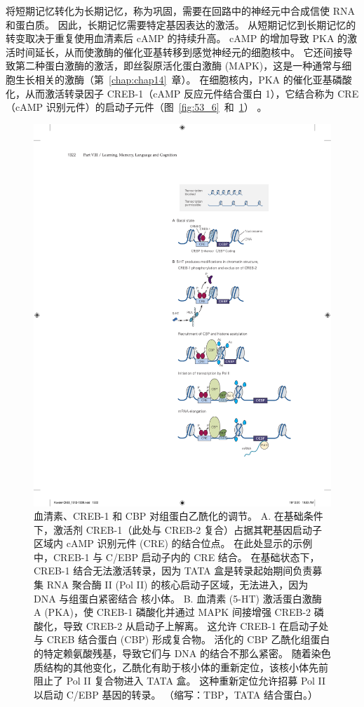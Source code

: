 将短期记忆转化为长期记忆，称为巩固，需要在回路中的神经元中合成信使 RNA 和蛋白质。
因此，长期记忆需要特定基因表达的激活。
从短期记忆到长期记忆的转变取决于重复使用血清素后 cAMP 的持续升高。
cAMP 的增加导致 PKA 的激活时间延长，从而使激酶的催化亚基转移到感觉神经元的细胞核中。
它还间接导致第二种蛋白激酶的激活，即丝裂原活化蛋白激酶 (MAPK)，这是一种通常与细胞生长相关的激酶（第~\ref{chap:chap14}~章）。
在细胞核内，PKA 的催化亚基磷酸化，从而激活转录因子 CREB-1（cAMP 反应元件结合蛋白 1），它结合称为 CRE（cAMP 识别元件）的启动子元件（图~\ref{fig:53_6}~和~\ref{fig:53_7}） 。


\begin{figure}[htbp]
	\centering
	\includegraphics[width=0.6\linewidth]{chap53/fig_53_7}
	\caption{血清素、CREB-1 和 CBP 对组蛋白乙酰化的调节。 A. 在基础条件下，激活剂 CREB-1（此处与 CREB-2 复合）占据其靶基因启动子区域内 cAMP 识别元件 (CRE) 的结合位点。 在此处显示的示例中，CREB-1 与 C/EBP 启动子内的 CRE 结合。 在基础状态下，CREB-1 结合无法激活转录，因为 TATA 盒是转录起始期间负责募集 RNA 聚合酶 II (Pol II) 的核心启动子区域，无法进入，因为 DNA 与组蛋白紧密结合 核小体。 B. 血清素 (5-HT) 激活蛋白激酶 A (PKA)，使 CREB-1 磷酸化并通过 MAPK 间接增强 CREB-2 磷酸化，导致 CREB-2 从启动子上解离。 这允许 CREB-1 在启动子处与 CREB 结合蛋白 (CBP) 形成复合物。 活化的 CBP 乙酰化组蛋白的特定赖氨酸残基，导致它们与 DNA 的结合不那么紧密。 随着染色质结构的其他变化，乙酰化有助于核小体的重新定位，该核小体先前阻止了 Pol II 复合物进入 TATA 盒。 这种重新定位允许招募 Pol II 以启动 C/EBP 基因的转录。 （缩写：TBP，TATA 结合蛋白。）}
	\label{fig:53_7}
\end{figure}


